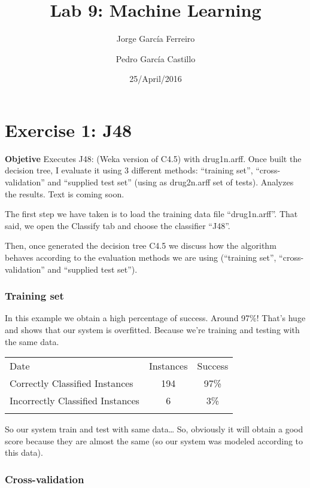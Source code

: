 \documentclass[]{article}
\title{Lab 9: Machine Learning}
\author{Jorge García Ferreiro \and Pedro García Castillo}
\date{25/April/2016}
\begin{document}
\maketitle

\section{Exercise 1: J48}\label{exercise-1-j48}

\textbf{Objetive} Executes J48: (Weka version of C4.5) with drug1n.arff.
Once built the decision tree, I evaluate it using 3 different methods:
``training set'', ``cross-validation'' and ``supplied test set'' (using
as drug2n.arff set of tests). Analyzes the results. Text is coming soon.

The first step we have taken is to load the training data file
``drug1n.arff''. That said, we open the Classify tab and choose the
classifier ``J48''.

Then, once generated the decision tree C4.5 we discuss how the algorithm
behaves according to the evaluation methods we are using (``training
set'', ``cross-validation'' and ``supplied test set'').

\subsubsection{Training set}\label{training-set}

In this example we obtain a high percentage of success. Around 97\%!
That's huge and shows that our system is overfitted. Because we're
training and testing with the same data.

\begin{longtable}[c]{@{}lcc@{}}
\toprule\addlinespace
Date & Instances & Success
\\\addlinespace
\midrule\endhead
Correctly Classified Instances & 194 & 97\%
\\\addlinespace
Incorrectly Classified Instances & 6 & 3\%
\\\addlinespace
\bottomrule
\end{longtable}

So our system train and test with same data\ldots{} So, obviously it
will obtain a good score because they are almost the same (so our system
was modeled according to this data).

\subsubsection{Cross-validation}\label{cross-validation}
\end{document}
